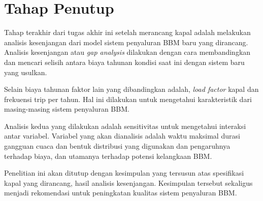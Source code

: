 \section{Tahap Penutup}
\label{sec:tahap-penutup}

    Tahap terakhir dari tugas akhir ini setelah merancang kapal adalah melakukan analisis kesenjangan dari model sistem penyaluran BBM baru yang dirancang. Analisis kesenjangan atau \emph{gap analysis} dilakukan dengan cara membandingkan dan mencari selisih antara biaya tahunan kondisi saat ini dengan sistem baru yang usulkan.

    Selain biaya tahunan faktor lain yang dibandingkan adalah, \emph{load factor} kapal dan frekuensi trip per tahun. Hal ini dilakukan untuk mengetahui karakteristik dari masing-masing sistem penyaluran BBM.

    Analisis kedua yang dilakukan adalah sensitivitas untuk mengetahui interaksi antar variabel. Variabel yang akan dianalisis adalah waktu maksimal durasi gangguan cuaca dan bentuk distribusi yang digunakan dan pengaruhnya terhadap biaya, dan utamanya terhadap potensi kelangkaan BBM.

    Penelitian ini akan ditutup dengan kesimpulan yang tersusun atas spesifikasi kapal yang dirancang, hasil analisis kesenjangan. Kesimpulan tersebut sekaligus menjadi rekomendasi untuk peningkatan kualitas sistem penyaluran BBM.